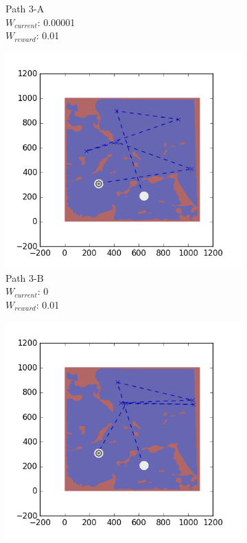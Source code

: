 \documentclass{tamuccthesis}
\begin{document}
\begin{figure}[H]
\begin{subfigure}[b]{0.24\textwidth}
        \caption{{\small Path 3-A \\ $W_{current}$: 0.00001 \\ $W_{reward}$: 0.01}}   
        \label{fig:Path_3-A_upReward_Work}
    \end{subfigure}
    \begin{subfigure}[b]{0.24\textwidth}
        \centering
        \includegraphics[width=\textwidth,trim={4cm 3cm 2cm 3cm},clip]{EXP3RG_PathCb_-1_-1_0_0d01.png}
        \caption{{\small Path 3-B \\ $W_{current}$: 0 \\ $W_{reward}$: 0.01}}    
        \label{fig:Path_3-B_upReward_noWork}
    \end{subfigure}
    \begin{subfigure}[b]{0.24\textwidth}  
        \centering 
        \includegraphics[width=\textwidth,trim={4cm 3cm 2cm 3cm},clip]{EXP3RG_PathCb_-1_-1_-1_0d01.png}

\end{subfigure}
\end{figure}
\end{document}
